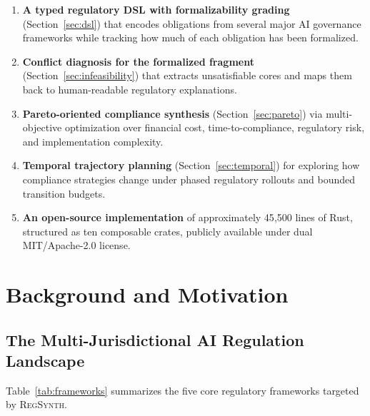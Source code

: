 \documentclass[11pt,twocolumn]{article}
\newcommand{\regsynth}{\textsc{RegSynth}}
\begin{document}
\begin{enumerate}[leftmargin=*,nosep]
  \item \textbf{A typed regulatory DSL with formalizability grading} (Section~\ref{sec:dsl})
    that encodes obligations from several major AI governance frameworks while
    tracking how much of each obligation has been formalized.
  \item \textbf{Conflict diagnosis for the formalized fragment} (Section~\ref{sec:infeasibility})
    that extracts unsatisfiable cores and maps them back to human-readable regulatory explanations.
  \item \textbf{Pareto-oriented compliance synthesis} (Section~\ref{sec:pareto})
    via multi-objective optimization over financial cost, time-to-compliance, regulatory risk,
    and implementation complexity.
  \item \textbf{Temporal trajectory planning} (Section~\ref{sec:temporal})
    for exploring how compliance strategies change under phased regulatory rollouts and bounded transition budgets.
  \item \textbf{An open-source implementation} of approximately 45{,}500 lines of
    Rust, structured as ten composable crates, publicly available under
    dual MIT/Apache-2.0 license.
\end{enumerate}

\section{Background and Motivation}
\label{sec:background}

\subsection{The Multi-Jurisdictional AI Regulation Landscape}

Table~\ref{tab:frameworks} summarizes the five core regulatory frameworks
targeted by \regsynth{}.
\end{document}
